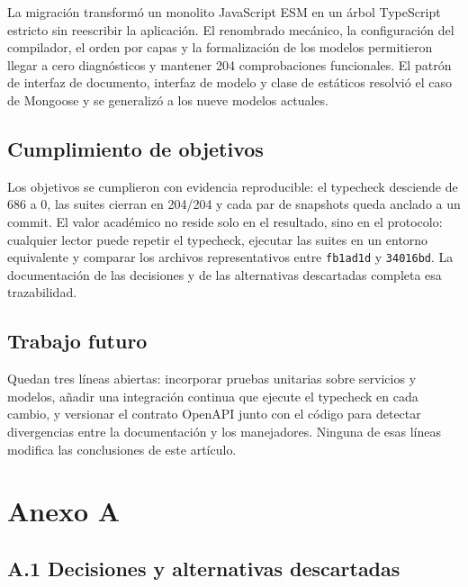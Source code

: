 \documentclass[conference]{IEEEtran}
\begin{document}
La migración transformó un monolito JavaScript ESM en un árbol TypeScript
estricto sin reescribir la aplicación. El renombrado mecánico, la configuración
del compilador, el orden por capas y la formalización de los modelos permitieron
llegar a cero diagnósticos y mantener 204 comprobaciones funcionales. El patrón
de interfaz de documento, interfaz de modelo y clase de estáticos resolvió el
caso de Mongoose y se generalizó a los nueve modelos actuales.

\subsection{Cumplimiento de objetivos}

Los objetivos se cumplieron con evidencia reproducible: el typecheck desciende
de 686 a 0, las suites cierran en 204/204 y cada par de snapshots queda anclado
a un commit. El valor académico no reside solo en el resultado, sino en el
protocolo: cualquier lector puede repetir el typecheck, ejecutar las suites en
un entorno equivalente y comparar los archivos representativos entre
\texttt{fb1ad1d} y \texttt{34016bd}. La documentación de las decisiones y de las
alternativas descartadas completa esa trazabilidad.

\subsection{Trabajo futuro}

Quedan tres líneas abiertas: incorporar pruebas unitarias sobre servicios y
modelos, añadir una integración continua que ejecute el typecheck en cada
cambio, y versionar el contrato OpenAPI junto con el código para detectar
divergencias entre la documentación y los manejadores. Ninguna de esas líneas
modifica las conclusiones de este artículo.

\clearpage




\section*{Anexo A}

\subsection*{A.1 Decisiones y alternativas descartadas}
\end{document}
